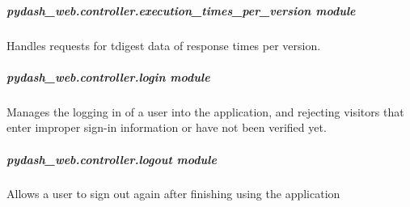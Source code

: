 \documentclass[letterpaper,10pt,english]{sphinxmanual}
\begin{document}
\subparagraph{pydash\_web.controller.execution\_times\_per\_version module}
\label{\detokenize{pydash_web.controller.execution_times_per_version:module-pydash_web.controller.execution_times_per_version}}\label{\detokenize{pydash_web.controller.execution_times_per_version:pydash-web-controller-execution-times-per-version-module}}\label{\detokenize{pydash_web.controller.execution_times_per_version::doc}}
Handles requests for tdigest data of response times per version.

\begin{fulllineitems}
\label{\detokenize{pydash_web.controller.execution_times_per_version:pydash_web.controller.execution_times_per_version.execution_times_per_version}}
\end{fulllineitems}



\subparagraph{pydash\_web.controller.login module}
\label{\detokenize{pydash_web.controller.login:module-pydash_web.controller.login}}\label{\detokenize{pydash_web.controller.login:pydash-web-controller-login-module}}\label{\detokenize{pydash_web.controller.login::doc}}
Manages the logging in of a user into the application,
and rejecting visitors that enter improper sign-in information or have not been verified yet.

\begin{fulllineitems}
\label{\detokenize{pydash_web.controller.login:pydash_web.controller.login.login}}
\end{fulllineitems}



\subparagraph{pydash\_web.controller.logout module}
\label{\detokenize{pydash_web.controller.logout:module-pydash_web.controller.logout}}\label{\detokenize{pydash_web.controller.logout:pydash-web-controller-logout-module}}\label{\detokenize{pydash_web.controller.logout::doc}}
Allows a user to sign out again after finishing using the application
\end{document}
